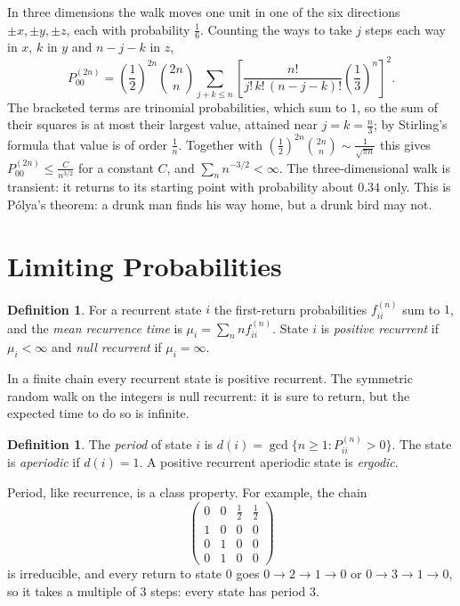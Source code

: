 \documentclass[12pt,a4paper]{report}
\theoremstyle{definition}
\newtheorem{defn}[thm]{Definition}
\begin{document}
In three dimensions the walk moves one unit in one of the six directions $\pm x, \pm y, \pm z$,
each with probability $\frac16$. Counting the ways to take $j$ steps each way in $x$, $k$ in $y$
and $n - j - k$ in $z$,
\[P_{00}^{(2n)} = \left(\frac12\right)^{2n}\binom{2n}{n}\sum_{j + k\leq n}\left[\frac{n!}{j!\,k!\,(n - j - k)!}\left(\frac13\right)^n\right]^2 .\]
The bracketed terms are trinomial probabilities, which sum to $1$, so the sum of their squares
is at most their largest value, attained near $j = k = \frac n3$; by Stirling's formula that
value is of order $\frac1n$. Together with $\left(\frac12\right)^{2n}\binom{2n}{n}\sim\frac{1}{\sqrt{\pi n}}$
this gives $P_{00}^{(2n)}\leq\frac{C}{n^{3/2}}$ for a constant $C$, and $\sum_nn^{-3/2}<\infty$. The
three-dimensional walk is transient: it returns to its starting point with probability about
$0.34$ only. This is P\'olya's theorem: a drunk man finds his way home, but a drunk bird may
not.

\section{Limiting Probabilities}
\label{sec:limiting}

\begin{defn}
\label{def:positiverecurrent}
For a recurrent state $i$ the first-return probabilities $f_{ii}^{(n)}$ sum to $1$, and the
\emph{mean recurrence time} is $\mu_i = \sum_nnf_{ii}^{(n)}$. State $i$ is \emph{positive recurrent}
if $\mu_i<\infty$ and \emph{null recurrent} if $\mu_i = \infty$.
\end{defn}

In a finite chain every recurrent state is positive recurrent. The symmetric random walk on
the integers is null recurrent: it is sure to return, but the expected time to do so is
infinite.

\begin{defn}
\label{def:period}
The \emph{period} of state $i$ is $d(i) = \gcd\{n\geq 1 : P_{ii}^{(n)}>0\}$. The state is
\emph{aperiodic} if $d(i) = 1$. A positive recurrent aperiodic state is \emph{ergodic}.
\end{defn}

Period, like recurrence, is a class property. For example, the chain
\[\begin{pmatrix}0 & 0 & \frac12 & \frac12\\ 1 & 0 & 0 & 0\\ 0 & 1 & 0 & 0\\ 0 & 1 & 0 & 0\end{pmatrix}\]
is irreducible, and every return to state $0$ goes $0\to 2\to 1\to 0$ or $0\to 3\to 1\to 0$, so it
takes a multiple of $3$ steps: every state has period $3$.
\end{document}
